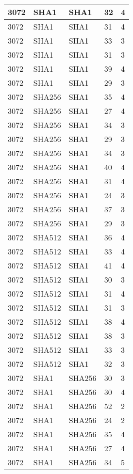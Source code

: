 \begin{tabular}{| l | l | l | l | l |}
3072 & SHA1 & SHA1 & 32 & 4 \\ \hline 
3072 & SHA1 & SHA1 & 31 & 4 \\ \hline 
3072 & SHA1 & SHA1 & 33 & 3 \\ \hline 
3072 & SHA1 & SHA1 & 31 & 3 \\ \hline 
3072 & SHA1 & SHA1 & 39 & 4 \\ \hline 
3072 & SHA1 & SHA1 & 29 & 3 \\ \hline 
3072 & SHA256 & SHA1 & 35 & 4 \\ \hline 
3072 & SHA256 & SHA1 & 27 & 4 \\ \hline 
3072 & SHA256 & SHA1 & 34 & 3 \\ \hline 
3072 & SHA256 & SHA1 & 29 & 3 \\ \hline 
3072 & SHA256 & SHA1 & 34 & 3 \\ \hline 
3072 & SHA256 & SHA1 & 40 & 4 \\ \hline 
3072 & SHA256 & SHA1 & 31 & 4 \\ \hline 
3072 & SHA256 & SHA1 & 24 & 3 \\ \hline 
3072 & SHA256 & SHA1 & 37 & 3 \\ \hline 
3072 & SHA256 & SHA1 & 29 & 3 \\ \hline 
3072 & SHA512 & SHA1 & 36 & 4 \\ \hline 
3072 & SHA512 & SHA1 & 33 & 4 \\ \hline 
3072 & SHA512 & SHA1 & 41 & 4 \\ \hline 
3072 & SHA512 & SHA1 & 30 & 3 \\ \hline 
3072 & SHA512 & SHA1 & 31 & 4 \\ \hline 
3072 & SHA512 & SHA1 & 31 & 3 \\ \hline 
3072 & SHA512 & SHA1 & 38 & 4 \\ \hline 
3072 & SHA512 & SHA1 & 38 & 3 \\ \hline 
3072 & SHA512 & SHA1 & 33 & 3 \\ \hline 
3072 & SHA512 & SHA1 & 32 & 3 \\ \hline 
3072 & SHA1 & SHA256 & 30 & 3 \\ \hline 
3072 & SHA1 & SHA256 & 30 & 4 \\ \hline 
3072 & SHA1 & SHA256 & 52 & 2 \\ \hline 
3072 & SHA1 & SHA256 & 24 & 2 \\ \hline 
3072 & SHA1 & SHA256 & 35 & 4 \\ \hline 
3072 & SHA1 & SHA256 & 27 & 4 \\ \hline 
3072 & SHA1 & SHA256 & 34 & 5 \\ \hline 

\end{tabular}
